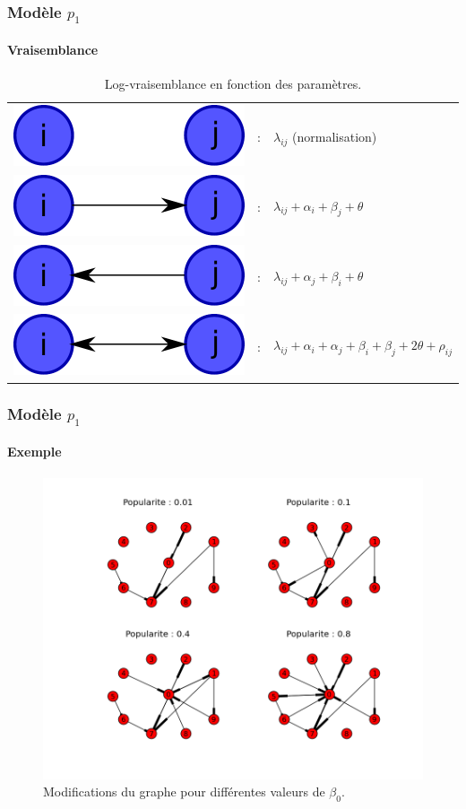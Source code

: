 \documentclass[c]{beamer}
\begin{document}
\begin{frame}
    \frametitle{Modèle $p_1$}
    \framesubtitle{Vraisemblance}

    \begin{table}
        \begin{tabular}[c]{m{} m{} m{}}
                \includegraphics[width=.2\textwidth]{./figures/p1_00.pdf}
                & : &
                $\lambda_{ij}$ (normalisation)\\
                \includegraphics[width=.2\textwidth]{./figures/p1_10.pdf}
                & : &
                $\lambda_{ij} + \alpha_i + \beta_j + \theta$ \\
                \includegraphics[width=.2\textwidth]{./figures/p1_01.pdf}
                & : &
                $\lambda_{ij} + \alpha_j + \beta_i + \theta$ \\
                \includegraphics[width=.2\textwidth]{./figures/p1_11.pdf}
                & : &
                $\lambda_{ij} + \alpha_i + \alpha_j + \beta_i + \beta_j + 2\theta + \rho_{ij}$
        \end{tabular}
        \caption{Log-vraisemblance en fonction des paramètres.}
    \end{table}

\end{frame}

\begin{frame}
    \frametitle{Modèle $p_1$}
    \framesubtitle{Exemple}
    \begin{figure}
        \includegraphics[width=.7\textwidth]{./figures/p1_popularite.png}
        \caption{Modifications du graphe pour différentes valeurs de $\beta_0$.}
    \end{figure}
\end{frame}
\end{document}
